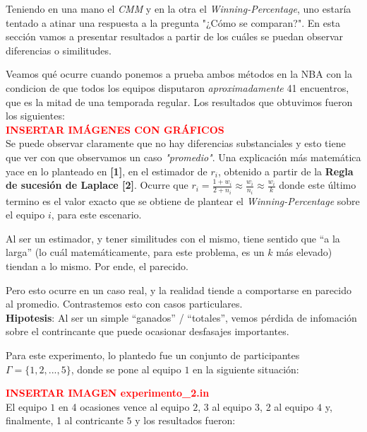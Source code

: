 Teniendo en una mano el \textit{CMM} y en la otra el \textit{Winning-Percentage}, uno estar\'ia tentado a atinar una respuesta a la pregunta "¿C\'omo se comparan?". En esta secci\'on vamos a presentar resultados a partir de los cu\'ales se puedan observar diferencias o similitudes.

Veamos qu\'e ocurre cuando ponemos a prueba ambos m\'etodos en la NBA con la condicion de que todos los equipos disputaron \textit{aproximadamente} 41 encuentros, que es la mitad de una temporada regular. Los resultados que obtuvimos fueron los siguientes: \\

\textcolor{red}{\textbf{INSERTAR IM\'AGENES CON GR\'AFICOS}} \\

Se puede observar claramente que no hay diferencias substanciales y esto tiene que ver con que observamos un caso \textit{"promedio"}. Una explicaci\'on m\'as matem\'atica yace en lo planteado en \textbf{[1]}, en el estimador de $r_{i}$, obtenido a partir de la \textbf{Regla de sucesi\'on de Laplace [2]}. Ocurre que $r_{i} = \frac{1 + w_{i}}{2 + n_{i}} \approx \frac{w_{i}}{n_{i}} \approx \frac{w_{i}}{k}$ donde este \'ultimo termino es el valor exacto que se obtiene de plantear el \textit{Winning-Percentage} sobre el equipo $i$, para este escenario. 

Al ser un estimador, y tener similitudes con el mismo, tiene sentido que ``a la larga'' (lo cu\'al matem\'aticamente, para este problema, es un $k$ m\'as elevado) tiendan a lo mismo. Por ende, el parecido.

Pero esto ocurre en un caso real, y la realidad tiende a comportarse en parecido al promedio. Contrastemos esto con casos particulares. \\

\textbf{Hipotesis}: Al ser un simple ``ganados'' / ``totales'', vemos p\'erdida de infomaci\'on sobre el contrincante que puede ocasionar desfasajes importantes.

Para este experimento, lo plantedo fue un conjunto de participantes $\Gamma = \{1,2,...,5\}$, donde se pone al equipo $1$ en la siguiente situaci\'on:

\textcolor{red}{\textbf{INSERTAR IMAGEN experimento_2.in}} \\

El equipo $1$ en 4 ocasiones vence al equipo $2$, 3 al equipo $3$, 2 al equipo $4$ y, finalmente, 1 al contricante $5$ y los resultados fueron: \\

